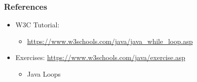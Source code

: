 \documentclass{beamer}
\begin{document}
	\begin{frame}
		\frametitle{References}
		\begin{itemize}
			\item W3C Tutorial: 
			\begin{itemize}
				\item \url{https://www.w3schools.com/java/java_while_loop.asp}
			\end{itemize}
			\item Exercises: \url{https://www.w3schools.com/java/exercise.asp}
			\begin{itemize}
				\item Java Loops
			\end{itemize}
		\end{itemize}
		
	\end{frame}
\end{document}

